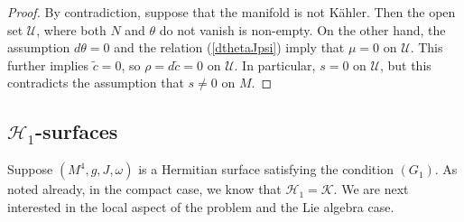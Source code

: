 \documentclass{amsart}
\begin{document}
\begin{proof}
    By contradiction, suppose that the manifold is not K\"ahler. Then the open set $\mathcal{U}$, where both $N$ and $\theta$ do not vanish is non-empty. On the other hand, the assumption $d \theta = 0$ and the relation (\ref{dthetaJpsi}) imply that $\mu = 0$ on $\mathcal{U}$. This further implies $\tilde{c} = 0$, so $\rho = d \tilde{c} = 0$ on $\mathcal{U}$. In particular, $ s = 0$ on $\mathcal{U}$, but this contradicts the assumption that $s \neq 0$ on $M$.
\end{proof}







\subsection{$\mathcal{H}_1$-surfaces} Suppose $(M^4, g, J, \omega)$ is a Hermitian surface satisfying the condition $(G_1)$. As noted already, in the compact case, we know that $\mathcal{H}_1 = \mathcal{K} $. We are next interested in the local aspect of the problem and the Lie algebra case. 

\vspace{0.2cm}
\end{document}
